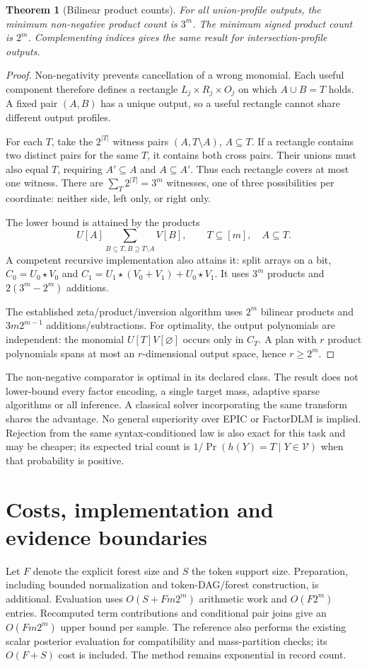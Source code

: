 \documentclass[11pt,a4paper]{article}
\newtheorem{theorem}{Theorem}
\begin{document}
\begin{theorem}[Bilinear product counts]
For all union-profile outputs, the minimum non-negative product count is
$3^m$. The minimum signed product count is $2^m$. Complementing indices gives
the same result for intersection-profile outputs.
\end{theorem}
\begin{proof}
Non-negativity prevents cancellation of a wrong monomial. Each useful
component therefore defines a rectangle $L_j\times R_j\times O_j$ on which
$A\cup B=T$ holds. A fixed pair $(A,B)$ has a unique output, so a useful
rectangle cannot share different output profiles.

For each $T$, take the $2^{|T|}$ witness pairs $(A,T\setminus A)$,
$A\subseteq T$. If a rectangle contains two distinct pairs for the same $T$,
it contains both cross pairs. Their unions must also equal $T$, requiring
$A'\subseteq A$ and $A\subseteq A'$. Thus each rectangle covers at most one
witness. There are $\sum_T2^{|T|}=3^m$ witnesses, one of three possibilities
per coordinate: neither side, left only, or right only.

The lower bound is attained by the products
\[
 U[A]\sum_{B\subseteq T,B\supseteq T\setminus A}V[B],
 \qquad T\subseteq[m],\quad A\subseteq T.
\]
A competent recursive implementation also attains it: split arrays on a bit,
$C_0=U_0\star V_0$ and
$C_1=U_1\star(V_0+V_1)+U_0\star V_1$.
It uses $3^m$ products and $2(3^m-2^m)$ additions.

The established zeta/product/inversion algorithm uses $2^m$ bilinear
products and $3m2^{m-1}$ additions/subtractions. For optimality, the output
polynomials are independent: the monomial $U[T]V[\varnothing]$ occurs only
in $C_T$. A plan with $r$ product polynomials spans at most an $r$-dimensional
output space, hence $r\geq2^m$.
\end{proof}

The non-negative comparator is optimal in its declared class. The result
does not lower-bound every factor encoding, a single target mass, adaptive
sparse algorithms or all inference. A classical solver incorporating the same
transform shares the advantage. No general superiority over EPIC or FactorDLM
is implied. Rejection from the same syntax-conditioned law is also exact for
this task and may be cheaper; its expected trial count is
$1/\Pr(h(Y)=T\mid Y\in\mathcal V)$ when that probability is positive.

\section{Costs, implementation and evidence boundaries}
Let $F$ denote the explicit forest size and $S$ the token support size.
Preparation, including bounded normalization and token-DAG/forest construction,
is additional. Evaluation uses $O(S+Fm2^m)$ arithmetic work and $O(F2^m)$
entries. Recomputed term contributions and conditional pair joins give an
$O(Fm2^m)$ upper bound per sample. The reference also performs the existing
scalar posterior evaluation for compatibility and mass-partition checks;
its $O(F+S)$ cost is included. The method remains exponential in record count.
\end{document}
